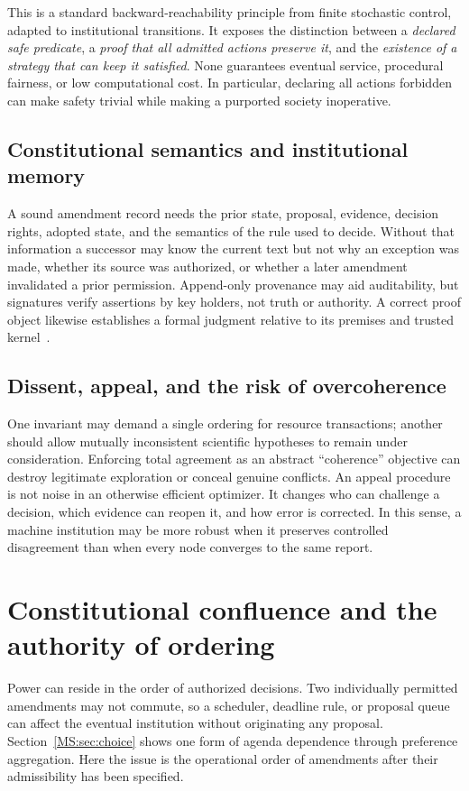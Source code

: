 This is a standard backward-reachability principle from finite stochastic control, adapted to institutional transitions. It exposes the distinction between a \emph{declared safe predicate}, a \emph{proof that all admitted actions preserve it}, and the \emph{existence of a strategy that can keep it satisfied}. None guarantees eventual service, procedural fairness, or low computational cost. In particular, declaring all actions forbidden can make safety trivial while making a purported society inoperative.

\subsection{Constitutional semantics and institutional memory}

A sound amendment record needs the prior state, proposal, evidence, decision rights, adopted state, and the semantics of the rule used to decide. Without that information a successor may know the current text but not why an exception was made, whether its source was authorized, or whether a later amendment invalidated a prior permission. Append-only provenance may aid auditability, but signatures verify assertions by key holders, not truth or authority. A correct proof object likewise establishes a formal judgment relative to its premises and trusted kernel~\cite{MS:necula}.

\subsection{Dissent, appeal, and the risk of overcoherence}

One invariant may demand a single ordering for resource transactions; another should allow mutually inconsistent scientific hypotheses to remain under consideration. Enforcing total agreement as an abstract ``coherence'' objective can destroy legitimate exploration or conceal genuine conflicts. An appeal procedure is not noise in an otherwise efficient optimizer. It changes who can challenge a decision, which evidence can reopen it, and how error is corrected. In this sense, a machine institution may be more robust when it preserves controlled disagreement than when every node converges to the same report.


\section{Constitutional confluence and the authority of ordering}\label{MS:sec:confluence}
Power can reside in the order of authorized decisions. Two individually permitted amendments may not commute, so a scheduler, deadline rule, or proposal queue can affect the eventual institution without originating any proposal. Section~\ref{MS:sec:choice} shows one form of agenda dependence through preference aggregation. Here the issue is the operational order of amendments after their admissibility has been specified.

